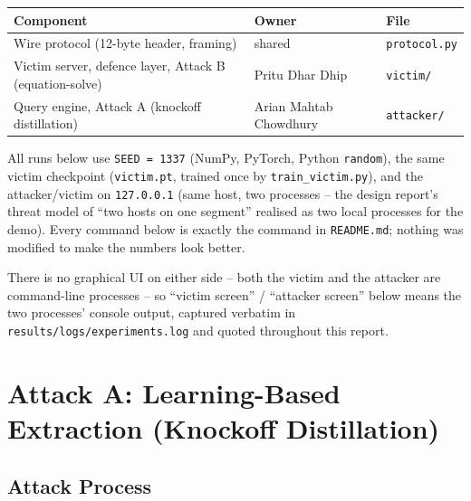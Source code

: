 \documentclass[11pt]{article}
\begin{document}
\begin{center}
\begin{tabular}{@{}lll}
\toprule
\textbf{Component} & \textbf{Owner} & \textbf{File} \\
\midrule
Wire protocol (12-byte header, framing) & shared & \texttt{protocol.py} \\
Victim server, defence layer, Attack B (equation-solve) & Pritu Dhar Dhip & \texttt{victim/} \\
Query engine, Attack A (knockoff distillation) & Arian Mahtab Chowdhury & \texttt{attacker/} \\
\bottomrule
\end{tabular}
\end{center}

All runs below use \texttt{SEED = 1337} (NumPy, PyTorch, Python \texttt{random}),
the same victim checkpoint (\texttt{victim.pt}, trained once by
\texttt{train\_victim.py}), and the attacker/victim on \texttt{127.0.0.1}
(same host, two processes -- the design report's threat model of ``two hosts
on one segment'' realised as two local processes for the demo). Every command
below is exactly the command in \texttt{README.md}; nothing was modified to
make the numbers look better.

There is no graphical UI on either side -- both the victim and the attacker
are command-line processes -- so ``victim screen'' / ``attacker screen''
below means the two processes' console output, captured verbatim in
\texttt{results/logs/experiments.log} and quoted throughout this report.

\section{Attack A: Learning-Based Extraction (Knockoff Distillation)}

\subsection{Attack Process}
\end{document}
